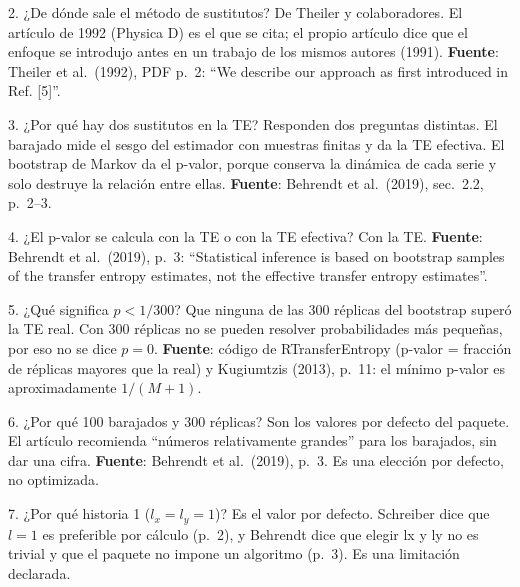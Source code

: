 \documentclass[11pt,openany]{book}
\begin{document}
\begin{respuesta}{2. ¿De dónde sale el método de sustitutos?}
De Theiler y colaboradores. El artículo de 1992 (Physica D) es el que se cita; el propio artículo dice que el enfoque se introdujo antes en un trabajo de los mismos autores (1991). \textbf{Fuente}: Theiler et al.\ (1992), PDF p.~2: ``We describe our approach as first introduced in Ref. [5]''.
\end{respuesta}

\begin{respuesta}{3. ¿Por qué hay dos sustitutos en la TE?}
Responden dos preguntas distintas. El barajado mide el sesgo del estimador con muestras finitas y da la TE efectiva. El bootstrap de Markov da el p-valor, porque conserva la dinámica de cada serie y solo destruye la relación entre ellas. \textbf{Fuente}: Behrendt et al.\ (2019), sec.~2.2, p.~2--3.
\end{respuesta}

\begin{respuesta}{4. ¿El p-valor se calcula con la TE o con la TE efectiva?}
Con la TE. \textbf{Fuente}: Behrendt et al.\ (2019), p.~3: ``Statistical inference is based on bootstrap samples of the transfer entropy estimates, not the effective transfer entropy estimates''.
\end{respuesta}

\begin{respuesta}{5. ¿Qué significa $p < 1/300$?}
Que ninguna de las 300 réplicas del bootstrap superó la TE real. Con 300 réplicas no se pueden resolver probabilidades más pequeñas, por eso no se dice $p = 0$. \textbf{Fuente}: código de RTransferEntropy (p-valor = fracción de réplicas mayores que la real) y Kugiumtzis (2013), p.~11: el mínimo p-valor es aproximadamente $1/(M+1)$.
\end{respuesta}

\begin{respuesta}{6. ¿Por qué 100 barajados y 300 réplicas?}
Son los valores por defecto del paquete. El artículo recomienda ``números relativamente grandes'' para los barajados, sin dar una cifra. \textbf{Fuente}: Behrendt et al.\ (2019), p.~3. Es una elección por defecto, no optimizada.
\end{respuesta}

\begin{respuesta}{7. ¿Por qué historia 1 ($l_x = l_y = 1$)?}
Es el valor por defecto. Schreiber dice que $l = 1$ es preferible por cálculo (p.~2), y Behrendt dice que elegir lx y ly no es trivial y que el paquete no impone un algoritmo (p.~3). Es una limitación declarada.
\end{respuesta}
\end{document}
